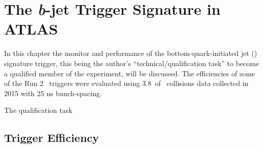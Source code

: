 \chapter{The \emph{b}-jet Trigger Signature in ATLAS}
\label{ch:trigger}

	In this chapter the monitor and performance of the bottom-quark-initiated jet (\bj) signature trigger, this being the author’s ``technical/qualification task'' to become a qualified member of the experiment, will be discussed. The efficiencies of some of the Run 2 \bj\ triggers were evaluated using 3.8\ifb\ of \pp\ collisions data collected in 2015 with 25 ns bunch-spacing.

	The qualification task
	
	\section{Trigger Efficiency}